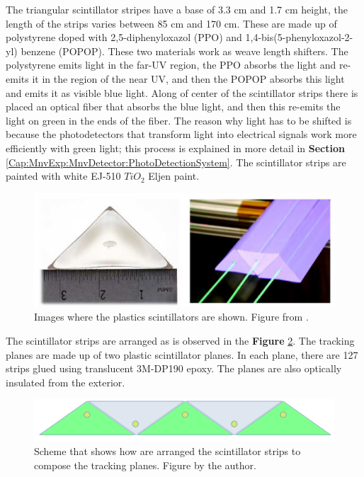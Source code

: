 The triangular scintillator stripes have a base of 3.3 cm and 1.7 cm height, the length of the strips varies between 85 cm and 170 cm. These are made up of polystyrene doped with 2,5-diphenyloxazol (PPO) and 1,4-bis(5-phenyloxazol-2-yl) benzene (POPOP). These two materials work as weave length shifters. The polystyrene emits light in the far-UV region, the PPO absorbs the light and re-emits it in the region of the near UV, and then the POPOP absorbs this light and emits it as visible blue light. Along of center of the scintillator strips there is placed an optical fiber that absorbs the blue light, and then this re-emits the light on green in the ends of the fiber. The reason why light has to be shifted is because the photodetectors that transform light into electrical signals work more efficiently with green light; this process is explained in more detail in \textbf{ Section} \ref{Cap:MnvExp:MnvDetector:PhotoDetectionSystem}. The scintillator strips are painted with white EJ-510 $TiO_2$ Eljen paint\cite{StripsPaint}. 


\begin{figure}[!htb]
\centering
\includegraphics[scale=0.3]{Figures/Chapter2/ScintStripes.png}

        \caption{Images where the plastics scintillators are shown. Figure from \cite{MINERvA}.} 
\label{fig:MnvExp:MnvDetector:TriangularStripes}
\end{figure}

The scintillator strips are arranged as is observed in the \textbf{Figure} \ref{fig:MnvExp:MnvDetector:StripsArrange}. The tracking planes are made up of two plastic scintillator planes. In each plane, there are 127 strips glued using translucent 3M-DP190 epoxy. The planes are also optically insulated from the exterior. 

\begin{figure}[!htb]
\centering
\includegraphics[scale=0.3]{Figures/Chapter2/stripsArrange.png}

        \caption{Scheme that shows how are arranged the scintillator strips to compose the tracking planes. Figure by the author.} 
\label{fig:MnvExp:MnvDetector:StripsArrange}
\end{figure}

